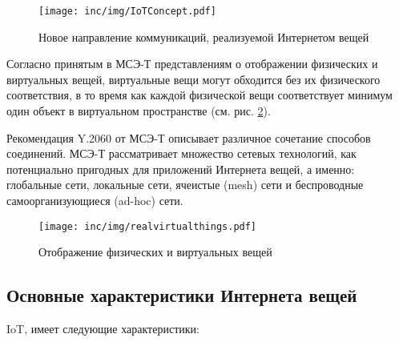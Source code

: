 \begin{figure}
  \centering
  \texttt{[image: inc/img/IoTConcept.pdf]}
	\caption{Новое направление коммуникаций, реализуемой Интернетом вещей}
  \label{fig:iotconcept}
\end{figure}

Согласно принятым в МСЭ-Т представлениям о отображении физических и виртуальных вещей, виртуальные вещи могут обходится без их физического соответствия, в то время как каждой физической вещи соответствует минимум один объект в виртуальном пространстве (см. рис. \ref{fig:physvirtworld}).  

Рекомендация Y.2060 от МСЭ-Т описывает различное сочетание способов соединений.
МСЭ-Т рассматривает множество сетевых технологий, как потенциально пригодных для приложений Интернета вещей, а именно: глобальные сети, локальные сети, ячеистые (mesh) сети и беспроводные самоорганизующиеся (ad-hoc) сети.

\begin{figure}
  \centering
  \texttt{[image: inc/img/realvirtualthings.pdf]}
	\caption{Отображение физических и виртуальных вещей}
  \label{fig:physvirtworld}
\end{figure}

\subsection{Основные характеристики Интернета вещей}

IoT, имеет следующие характеристики:

